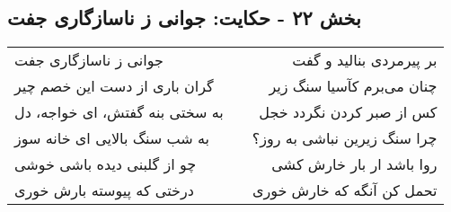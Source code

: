 \begin{center}
\section*{بخش ۲۲ - حکایت: جوانی ز ناسازگاری جفت}
\label{sec:022}
\begin{longtable}{l p{0.5cm} r}
جوانی ز ناسازگاری جفت
&&
بر پیرمردی بنالید و گفت
\\
گران باری از دست این خصم چیر
&&
چنان می‌برم کآسیا سنگ زیر
\\
به سختی بنه گفتش، ای خواجه، دل
&&
کس از صبر کردن نگردد خجل
\\
به شب سنگ بالایی ای خانه سوز
&&
چرا سنگ زیرین نباشی به روز؟
\\
چو از گلبنی دیده باشی خوشی
&&
روا باشد ار بار خارش کشی
\\
درختی که پیوسته بارش خوری
&&
تحمل کن آنگه که خارش خوری
\\
\end{longtable}
\end{center}
